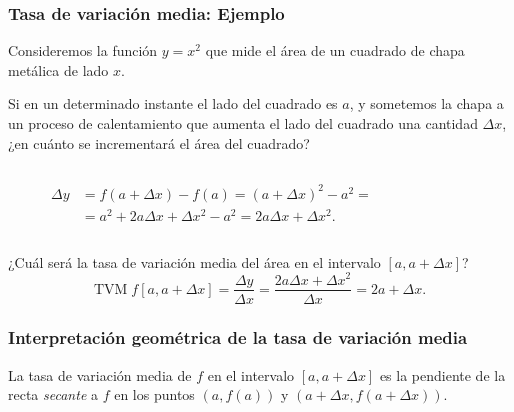 \begin{frame}
	\frametitle{Tasa de variación media: Ejemplo}
	Consideremos la función $y=x^2$ que mide el área de un cuadrado de chapa metálica de lado $x$.
	
	Si en un determinado instante el lado del cuadrado es $a$, y sometemos la chapa a un proceso de calentamiento que aumenta el lado del cuadrado una cantidad $\Delta x$, ¿en cuánto se incrementará el área del cuadrado?
	\begin{columns}
		\begin{column}{0.3\textwidth}
			\begin{align*}
				\Delta y & = f(a+\Delta x)-f(a)=(a+\Delta x)^2-a^2=               \\
				         & = a^2+2a\Delta x+\Delta x^2-a^2=2a\Delta x+\Delta x^2. 
			\end{align*}
		\end{column}
		\begin{column}{0.3\textwidth}
			\begin{center}
				\scalebox{1}{}
			\end{center}
		\end{column}
	\end{columns}
	¿Cuál será la tasa de variación media del área en el intervalo $[a,a+\Delta x]$?
	\[
		\textrm{TVM}\;f[a,a+\Delta x]=\frac{\Delta y}{\Delta x}=\frac{2a\Delta x+\Delta x^2}{\Delta x}=2a+\Delta x.
	\]
\end{frame}


\begin{frame}
	\frametitle{Interpretación geométrica de la tasa de variación media}
	La tasa de variación media de $f$ en el intervalo $[a,a+\Delta x]$ es la pendiente de la recta \emph{secante} a $f$ en los puntos $(a,f(a))$ y $(a+\Delta x,f(a+\Delta x))$.
	\begin{center}
		\scalebox{1}{}
	\end{center}
\end{frame}


